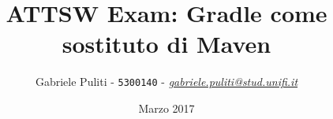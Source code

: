 \documentclass{article}
\title{ATTSW Exam: Gradle come sostituto di Maven}
\author{Gabriele Puliti - \texttt{5300140} - \href{mailto:gabriele.puliti@stud.unifi.it}{\textit{gabriele.puliti@stud.unifi.it}}}
\date{Marzo 2017}
\begin{document}
\maketitle

\newpage
\tableofcontents
\newpage

\begin{flushleft}


\newpage


\newpage

\newpage


\end{flushleft}
\end{document}
